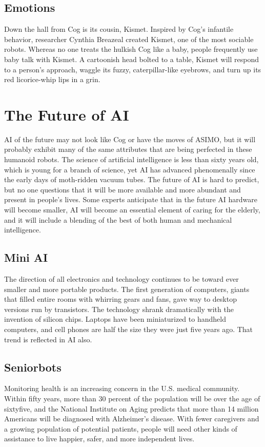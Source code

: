 \documentclass[12pt]{article}
\begin{document}
   \subsection{Emotions}
   \large
    Down the hall from Cog is its cousin, Kismet. Inspired by Cog’s infantile behavior, researcher Cynthia Breazeal created Kismet, one of the most sociable robots. Whereas no one treats the hulkish Cog like a baby, people frequently use baby talk with Kismet. A cartoonish head bolted to a table, Kismet will respond to a person’s approach, waggle its fuzzy, caterpillar-like eyebrows, and turn up its red licorice-whip lips in a grin.\\
 \newpage
\Huge
\section{\textbf{The Future of AI}}
\center
\large\flushleft   
AI of the future may not look like Cog or have the moves of ASIMO, but it will probably exhibit many of the same attributes that are being perfected in these humanoid robots. The science of artificial intelligence is less than sixty years old, which is young for a branch of science, yet AI has advanced phenomenally since the early days of moth-ridden vacuum tubes. The future of AI is hard to predict, but no one questions that it will be more available and more abundant and present in people’s lives. Some experts anticipate that in the future AI hardware will become smaller, AI will become an essential element of caring for the elderly, and it will include a blending of the best of both human and mechanical intelligence.\\
\huge
\subsection{Mini AI}
\large
 The direction of all electronics and technology continues to be toward ever smaller and more portable products. The first generation of computers, giants that filled entire rooms with whirring gears and fans, gave way to desktop versions run by transistors. The technology shrank dramatically with the invention of silicon chips. Laptops have been miniaturized to handheld computers, and cell phones are half the size they were just five years ago. That trend is reflected in AI also.\\
 \huge
 \subsection{Seniorbots}
 \large
  Monitoring health is an increasing concern in the U.S. medical community. Within fifty years, more than 30 percent of the population will be over the age of sixtyfive, and the National Institute on Aging predicts that more than 14 million Americans will be diagnosed with Alzheimer’s disease. With fewer caregivers and a growing population of potential patients, people will need other kinds of assistance to live happier, safer, and more independent lives. \\
  \huge
\end{document}
